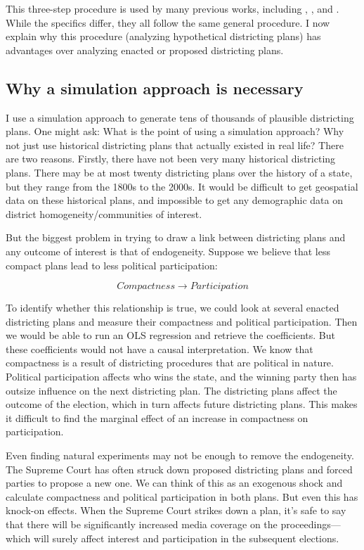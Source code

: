 \documentclass[]{article}
\begin{document}
This three-step procedure is used by many previous works, including
\cite{cr2013}, \cite{ddj2019comp}, and \cite{s2020}. While the specifics
differ, they all follow the same general procedure. I now explain why
this procedure (analyzing hypothetical districting plans) has advantages
over analyzing enacted or proposed districting plans.

\hypertarget{why-a-simulation-approach-is-necessary}{%
\subsection{Why a simulation approach is
necessary}\label{why-a-simulation-approach-is-necessary}}

I use a simulation approach to generate tens of thousands of plausible
districting plans. One might ask: What is the point of using a
simulation approach? Why not just use historical districting plans that
actually existed in real life? There are two reasons. Firstly, there
have not been very many historical districting plans. There may be at
most twenty districting plans over the history of a state, but they
range from the 1800s to the 2000s. It would be difficult to get
geospatial data on these historical plans, and impossible to get any
demographic data on district homogeneity/communities of interest.

But the biggest problem in trying to draw a link between districting
plans and any outcome of interest is that of endogeneity. Suppose we
believe that less compact plans lead to less political participation:

\[Compactness \rightarrow Participation\]

To identify whether this relationship is true, we could look at several
enacted districting plans and measure their compactness and political
participation. Then we would be able to run an OLS regression and
retrieve the coefficients. But these coefficients would not have a
causal interpretation. We know that compactness is a result of
districting procedures that are political in nature. Political
participation affects who wins the state, and the winning party then has
outsize influence on the next districting plan. The districting plans
affect the outcome of the election, which in turn affects future
districting plans. This makes it difficult to find the marginal effect
of an increase in compactness on participation.

Even finding natural experiments may not be enough to remove the
endogeneity. The Supreme Court has often struck down proposed
districting plans and forced parties to propose a new one. We can think
of this as an exogenous shock and calculate compactness and political
participation in both plans. But even this has knock-on effects. When
the Supreme Court strikes down a plan, it's safe to say that there will
be significantly increased media coverage on the proceedings---which
will surely affect interest and participation in the subsequent
elections.
\end{document}
